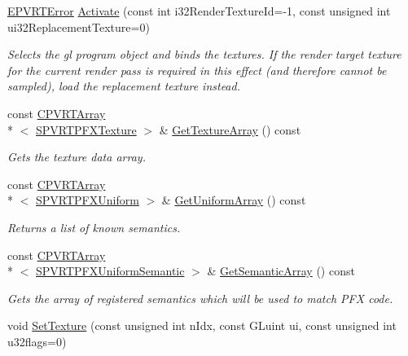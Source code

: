 \begin{DoxyCompactItemize}
\hyperlink{_p_v_r_t_error_8h_a9e837ff1a83f3a5f332bc4cc78454608}{E\+P\+V\+R\+T\+Error} \hyperlink{class_c_p_v_r_t_p_f_x_effect_a66c1e23696dd3c0acda2becdac348c69}{Activate} (const int i32\+Render\+Texture\+Id=-\/1, const unsigned int ui32\+Replacement\+Texture=0)
\begin{DoxyCompactList}\small\item\em Selects the gl program object and binds the textures. If the render target texture for the current render pass is required in this effect (and therefore cannot be sampled), load the replacement texture instead. \end{DoxyCompactList}\item 
const \hyperlink{class_c_p_v_r_t_array}{C\+P\+V\+R\+T\+Array}\\*
$<$ \hyperlink{struct_s_p_v_r_t_p_f_x_texture}{S\+P\+V\+R\+T\+P\+F\+X\+Texture} $>$ \& \hyperlink{class_c_p_v_r_t_p_f_x_effect_a7aa24a05385a6cc26a33d3ab5bea27d7}{Get\+Texture\+Array} () const 
\begin{DoxyCompactList}\small\item\em Gets the texture data array. \end{DoxyCompactList}\item 
const \hyperlink{class_c_p_v_r_t_array}{C\+P\+V\+R\+T\+Array}\\*
$<$ \hyperlink{struct_s_p_v_r_t_p_f_x_uniform}{S\+P\+V\+R\+T\+P\+F\+X\+Uniform} $>$ \& \hyperlink{class_c_p_v_r_t_p_f_x_effect_ab9f4ce64c4bd31eb5fb45d86f4239bed}{Get\+Uniform\+Array} () const 
\begin{DoxyCompactList}\small\item\em Returns a list of known semantics. \end{DoxyCompactList}\item 
const \hyperlink{class_c_p_v_r_t_array}{C\+P\+V\+R\+T\+Array}\\*
$<$ \hyperlink{struct_s_p_v_r_t_p_f_x_uniform_semantic}{S\+P\+V\+R\+T\+P\+F\+X\+Uniform\+Semantic} $>$ \& \hyperlink{class_c_p_v_r_t_p_f_x_effect_a3d05fab446c9120e3cfaf068fbb5cf72}{Get\+Semantic\+Array} () const 
\begin{DoxyCompactList}\small\item\em Gets the array of registered semantics which will be used to match P\+F\+X code. \end{DoxyCompactList}\item 
void \hyperlink{class_c_p_v_r_t_p_f_x_effect_a2c856bbaad1a9f8655eb0d46b60a7eb9}{Set\+Texture} (const unsigned int n\+Idx, const G\+Luint ui, const unsigned int u32flags=0)

\end{DoxyCompactItemize}
